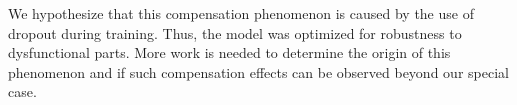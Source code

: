 We hypothesize that this compensation phenomenon is caused by the use of dropout during training. Thus, the model was optimized for robustness to dysfunctional parts. More work is needed to determine the origin of this phenomenon and if such compensation effects can be observed beyond our special case. 

% 








